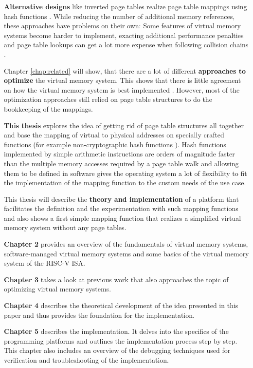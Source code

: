 \textbf{Alternative designs} like inverted page tables realize page table mappings using hash functions \cite{tanenbaumOS}. While reducing the number of additional memory references, these approaches have problems on their own: Some features of virtual memory systems become harder to implement, exacting additional performance penalties \cite{yaniv2016hash} and page table lookups can get a lot more expense when following collision chains \cite{jacob1998look}.

Chapter \ref{chap:related} will show, that there are a lot of different \textbf{approaches to optimize} the virtual memory system.
This shows that there is little agreement on how the virtual memory system is best implemented \cite{jacob1998look}.
However, most of the optimization approaches still relied on page table structures to do the bookkeeping of the mappings.

\textbf{This thesis} explores the idea of getting rid of page table structures all together and base the mapping of virtual to physical addresses on specially crafted functions (for example non-cryptographic hash functions \cite{mittelbach2021non}).
Hash functions implemented by simple arithmetic instructions are orders of magnitude faster than the multiple memory accesses required by a page table walk \cite{tanenbaumOS} and allowing them to be defined in software gives the operating system a lot of flexibility to fit the implementation of the mapping function to the custom needs of the use case.

This thesis will describe the \textbf{theory and implementation} of a platform that facilitates the definition and the experimentation with such mapping functions and also shows a first simple mapping function that realizes a simplified virtual memory system without any page tables.


\textbf{Chapter 2} provides an overview of the fundamentals of virtual memory systems, software-managed virtual memory systems and some basics of the virtual memory system of the RISC-V ISA.

\textbf{Chapter 3} takes a look at previous work that also approaches the topic of optimizing virtual memory systems.

\textbf{Chapter 4} describes the theoretical development of the idea presented in this paper and thus provides the foundation for the implementation.

\textbf{Chapter 5} describes the implementation. It delves into the specifics of the programming platforms and outlines the implementation process step by step. This chapter also includes an overview of the debugging techniques used for verification and troubleshooting of the implementation.

